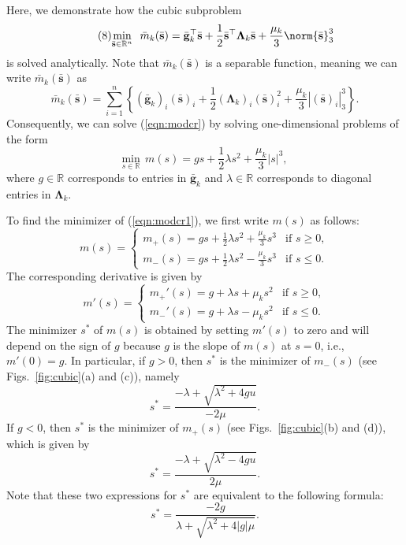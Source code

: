 


Here, we demonstrate how the cubic subproblem
\begin{equation}\label{eqn:modcr0}\tag{8}
	\underset{\bar{\mathbf{s}} \in \mathbb{R}^n}{\text{min}} \  \ \bar{{m}}_{k} (\bar{\mathbf{s}})
	= \bar{\mathbf{g}}_k^\top\bar{\mathbf{s}}
	+ \frac{1}{2}\bar{\mathbf{s}}^\top \mathbf{\Lambda}_k\bar{\mathbf{s}}
	+ \frac{\mu_k}{3}\norm{\bar{\mathbf{s}}}_3^3
\end{equation}
is solved analytically.  Note that $\bar{m}_k(\bar{\mathbf{s}})$ is a separable function,  
meaning we can write $\bar{m}_k(\bar{\mathbf{s}})$ as
$$
	\bar{m}_k(\bar{\mathbf{s}})
	=
	\sum_{i=1}^n
	\left \{
	(\bar{\mathbf{g}}_k)_i (\bar{\mathbf{s}})_i
	+
	\frac{1}{2}(\mathbf{\Lambda}_k)_i(\bar{\mathbf{s}})_i^2
	+
	\frac{\mu_k}{3} |(\bar{\mathbf{s}})_i |_3^3
	\right \}.
$$
Consequently, we can  solve (\ref{eqn:modcr}) by solving one-dimensional problems 
of the form 
\begin{equation}\label{eqn:modcr1}
	\underset{s \in \mathbb{R}}{\text{min}}  \ \ m(s)
	= gs  
	+ \frac{1}{2}\lambda s^2
	+ \frac{\mu_k}{3}|s|^3,
\end{equation}
where $g \in \mathbb{R}$ corresponds to entries in $\bar{\mathbf{g}}_k$ and
$\lambda \in \mathbb{R}$ corresponds to diagonal entries in $\mathbf{\Lambda}_k$.  

To find the minimizer of (\ref{eqn:modcr1}), we first write $m(s)$ as follows:
\begin{equation*}
	m(s) = 
	\begin{cases}
		m_+(s) = gs  
	+ \frac{1}{2}\lambda s^2
	+ \frac{\mu_k}{3}s^3 & \text{if $s \ge 0$}, \\
		m_-(s) = gs  
	+ \frac{1}{2}\lambda s^2
	- \frac{\mu_k}{3}s^3 & \text{if $s \le 0$}. 	
	\end{cases}
\end{equation*}
The corresponding derivative is given by
\begin{equation*}
	m'(s) = 
	\begin{cases}
		m_+'(s) = g
	+ \lambda s
	+ \mu_ks^2 & \text{if $s \ge 0$},\\
		m_-'(s) = g 
	+ \lambda s
	- \mu_ks^2 & \text{if $s \le 0$}.
	\end{cases}
\end{equation*}
The minimizer $s^*$ of $m(s)$ is obtained by setting $m'(s)$ to zero and will depend on the sign of $g$ because $g$ is the slope of $m(s)$ at $s = 0$, i.e., $m'(0) = g$.  
In particular,
if $g > 0$, then $s^*$  is the minimizer of $m_-(s)$ (see Figs.\ \ref{fig:cubic}(a) and (c)), namely
\begin{equation*}
	s^* = \frac{-\lambda + \sqrt{\lambda^2 + 4gu}}{-2\mu}.
\end{equation*}
If $g < 0$, then $s^*$ is the minimizer of $m_+(s)$ (see Figs.\ \ref{fig:cubic}(b) and (d)), which is given by
\begin{equation*}
	s^* = \frac{-\lambda + \sqrt{\lambda^2 - 4gu}}{2\mu}.
\end{equation*}
Note that these two expressions
for $s^*$ are equivalent to the following formula:
$$
	s^* = \frac{-2g}{\lambda + \sqrt{\lambda^2 + 4|g|\mu}}.
$$






